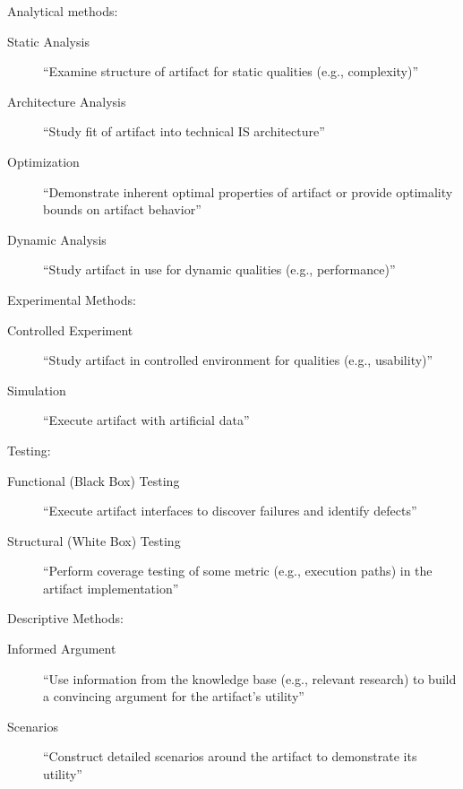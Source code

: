 Analytical methods:

\begin{description}
  \item[Static Analysis] ``Examine structure of artifact for static qualities (e.g., complexity)''
  \item[Architecture Analysis] ``Study fit of artifact into technical IS architecture''
  \item[Optimization] ``Demonstrate inherent optimal properties of artifact or provide optimality bounds on artifact behavior''
  \item[Dynamic Analysis] ``Study artifact in use for dynamic qualities (e.g., performance)''
\end{description}

Experimental Methods:

\begin{description}
  \item[Controlled Experiment] ``Study artifact in controlled environment for qualities (e.g., usability)''
  \item[Simulation] ``Execute artifact with artificial data''
\end{description}

Testing:

\begin{description}
  \item[Functional (Black Box) Testing] ``Execute artifact interfaces to discover failures and identify defects''
  \item[Structural (White Box) Testing] ``Perform coverage testing of some metric (e.g., execution paths) in the artifact implementation''
\end{description}

Descriptive Methods:

\begin{description}
  \item[Informed Argument] ``Use information from the knowledge base (e.g., relevant research) to build a convincing argument for the artifact’s utility''
  \item[Scenarios] ``Construct detailed scenarios around the artifact to demonstrate its utility''
\end{description}
